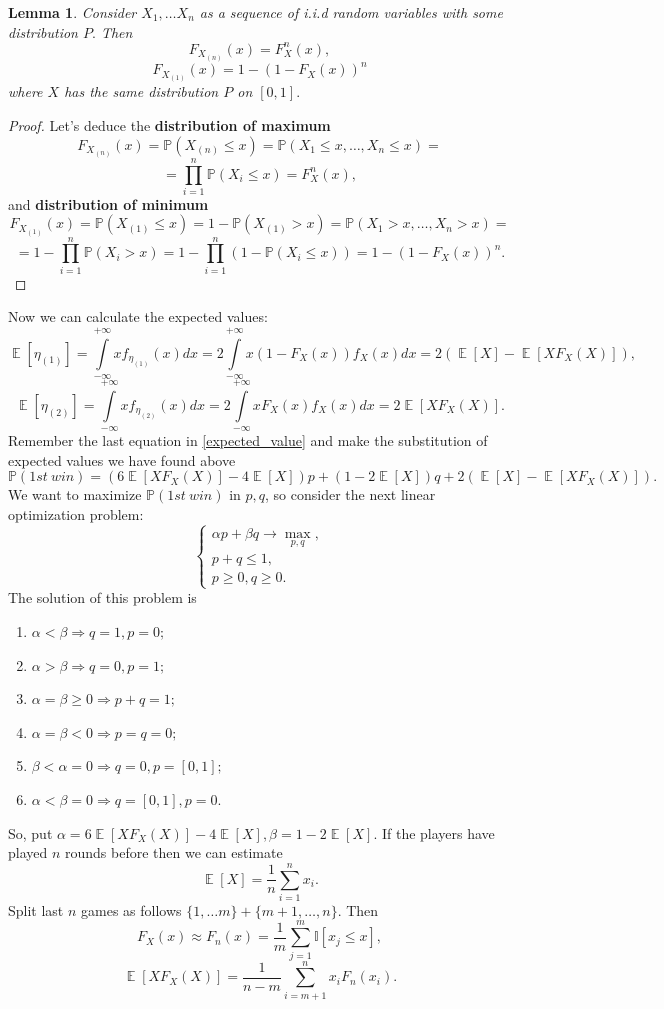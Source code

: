 \documentclass[a4paper, 12pt]{article}
\DeclareMathOperator*{\E}{\mathbb{E}}
\renewcommand*{\P}{\mathbb{P}}
\newtheorem{lemma}{Lemma}
\begin{document}
\begin{lemma}
Consider $X_1, \ldots X_n $ as a sequence of i.i.d random variables with some distribution $P.$ Then
$$
F_{X_{(n)}}(x) = F_{X}^n(x), 
$$
$$
F_{X_{(1)}}(x) = 1 - (1 - F_{X}(x))^n
$$
where $X$ has the same distribution $P$ on $[0, 1].$
\end{lemma}
\begin{proof} Let's deduce the \textbf{distribution of maximum}
$$
F_{X_{(n)}}(x) = \P(X_{(n)} \leqslant x) = \P (X_{1} \leqslant x, \ldots, X_{n} \leqslant x) =
$$
$$
 =\prod \limits_{i=1}^n \P(X_{i} \leqslant x) = F_{X}^n(x), 
$$
and \textbf{distribution of minimum} 
$$
F_{X_{(1)}}(x) = \P(X_{(1)} \leqslant x) = 1 - \P(X_{(1)} > x) = \P (X_{1} > x, \ldots, X_{n} > x) = 
$$
$$
 = 1 - \prod \limits_{i=1}^n \P(X_{i} > x) = 1 - \prod \limits_{i=1}^n(1 - \P(X_{i} \leqslant x)) = 1 - (1 - F_{X}(x))^n.
$$
\end{proof}
\noindent Now we can calculate the expected values: 
$$
\E[\eta_{(1)}] = \int \limits_{-\infty}^{+\infty} x f_{\eta_{(1)}}(x) dx = 2\int \limits_{-\infty}^{+\infty} x (1 - F_X(x)) f_{X}(x) dx = 2 (\E[X] - \E [X F_X(X)]), 
$$
$$
\E[\eta_{(2)}] = \int \limits_{-\infty}^{+\infty} x f_{\eta_{(2)}}(x) dx = 2 \int \limits_{-\infty}^{+\infty} x  F_X(x) f_{X}(x) dx = 2 \E [X F_X(X)].
$$
Remember the last equation in \eqref{expected_value} and make the substitution of expected values we have found above
$$
\P (1st \ win) = (6 \E[X F_X(X)] - 4 \E[X]) p + (1 - 2 \E[X]) q + 2 (\E[X] - \E [X F_X(X)]).
$$
We want to maximize $\P (1st \ win)$ in $p, q$, so consider the next linear optimization problem:
$$
\begin{cases}
\alpha p + \beta q \rightarrow \max \limits_{p, q}, \\
p + q \leqslant 1, \\
p \geqslant 0, q \geqslant 0.
\end{cases}
$$
The solution of this problem is
\begin{enumerate}
	\item $\alpha < \beta \Rightarrow q = 1, p = 0;$
	\item $\alpha > \beta \Rightarrow q = 0, p = 1;$
	\item $\alpha = \beta \geqslant 0 \Rightarrow p + q = 1;$
	\item $\alpha = \beta < 0 \Rightarrow p = q = 0;$
	\item $\beta < \alpha = 0 \Rightarrow q = 0, p = [0, 1];$
	\item $\alpha < \beta = 0 \Rightarrow q = [0, 1], p = 0.$
\end{enumerate}
So, put $\alpha = 6 \E[X F_X(X)] - 4 \E[X], \beta = 1 - 2 \E[X].$ If the players have played $n$ rounds before then we can estimate 
$$
\E[X] = \dfrac{1}{n} \sum \limits_{i=1}^n x_i.
$$
Split last $n$ games as follows $\{1, \ldots m \} + \{ m+1, \ldots, n \}.$ Then
$$
F_X(x) \approx F_n(x) = \dfrac{1}{m} \sum \limits_{j=1}^m \mathbb{I}[x_j \leqslant x],
$$
$$
\E [X F_X(X)] = \dfrac{1}{n - m} \sum \limits_{i = m+1}^n x_i F_n(x_i).
$$
\end{document}
